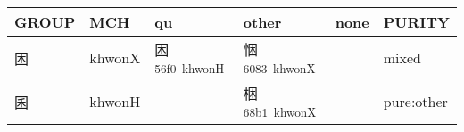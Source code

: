 \documentclass[14pt,a4paper]{scrartcl}
\begin{document}
\begin{longtable}[c]{@{}llllll@{}}
\toprule
\begin{minipage}[b]{0.14\columnwidth}\raggedright\strut
GROUP
\strut\end{minipage} &
\begin{minipage}[b]{0.14\columnwidth}\raggedright\strut
MCH
\strut\end{minipage} &
\begin{minipage}[b]{0.14\columnwidth}\raggedright\strut
qu
\strut\end{minipage} &
\begin{minipage}[b]{0.14\columnwidth}\raggedright\strut
other
\strut\end{minipage} &
\begin{minipage}[b]{0.14\columnwidth}\raggedright\strut
none
\strut\end{minipage} &
\begin{minipage}[b]{0.14\columnwidth}\raggedright\strut
PURITY
\strut\end{minipage}\tabularnewline
\midrule
\endhead
\begin{minipage}[t]{0.14\columnwidth}\raggedright\strut
困
\strut\end{minipage} &
\begin{minipage}[t]{0.14\columnwidth}\raggedright\strut
khwonX
\strut\end{minipage} &
\begin{minipage}[t]{0.14\columnwidth}\raggedright\strut
困\textsuperscript{56f0~khwonH}
\strut\end{minipage} &
\begin{minipage}[t]{0.14\columnwidth}\raggedright\strut
悃\textsuperscript{6083~khwonX}
\strut\end{minipage} &
\begin{minipage}[t]{0.14\columnwidth}\raggedright\strut
\strut\end{minipage} &
\begin{minipage}[t]{0.14\columnwidth}\raggedright\strut
mixed
\strut\end{minipage}\tabularnewline
\begin{minipage}[t]{0.14\columnwidth}\raggedright\strut
囷
\strut\end{minipage} &
\begin{minipage}[t]{0.14\columnwidth}\raggedright\strut
khwonH
\strut\end{minipage} &
\begin{minipage}[t]{0.14\columnwidth}\raggedright\strut
\strut\end{minipage} &
\begin{minipage}[t]{0.14\columnwidth}\raggedright\strut
梱\textsuperscript{68b1~khwonX}
\strut\end{minipage} &
\begin{minipage}[t]{0.14\columnwidth}\raggedright\strut
\strut\end{minipage} &
\begin{minipage}[t]{0.14\columnwidth}\raggedright\strut
pure:other
\strut\end{minipage}\tabularnewline
\bottomrule
\end{longtable}
\end{document}
